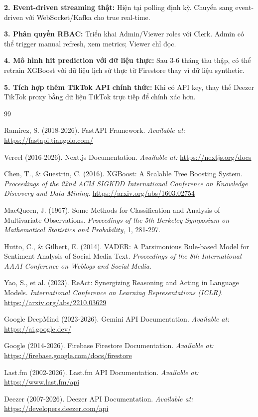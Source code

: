\documentclass[12pt,a4paper]{report}
\begin{document}
\noindent
\textbf{2. Event-driven streaming thật:} Hiện tại polling định kỳ. Chuyển sang event-driven với WebSocket/Kafka cho true real-time.

\noindent
\textbf{3. Phân quyền RBAC:} Triển khai Admin/Viewer roles với Clerk. Admin có thể trigger manual refresh, xem metrics; Viewer chỉ đọc.

\noindent
\textbf{4. Mô hình hit prediction với dữ liệu thực:} Sau 3-6 tháng thu thập, có thể retrain XGBoost với dữ liệu lịch sử thực từ Firestore thay vì dữ liệu synthetic.

\noindent
\textbf{5. Tích hợp thêm TikTok API chính thức:} Khi có API key, thay thế Deezer TikTok proxy bằng dữ liệu TikTok trực tiếp để chính xác hơn.

\begin{thebibliography}{99}

Ramírez, S. (2018-2026).
FastAPI Framework.
\textit{Available at:} \url{https://fastapi.tiangolo.com/}

Vercel (2016-2026).
Next.js Documentation.
\textit{Available at:} \url{https://nextjs.org/docs}

Chen, T., \& Guestrin, C. (2016).
XGBoost: A Scalable Tree Boosting System.
\textit{Proceedings of the 22nd ACM SIGKDD International Conference on Knowledge Discovery and Data Mining}.
\url{https://arxiv.org/abs/1603.02754}

MacQueen, J. (1967).
Some Methods for Classification and Analysis of Multivariate Observations.
\textit{Proceedings of the 5th Berkeley Symposium on Mathematical Statistics and Probability}, 1, 281-297.

Hutto, C., \& Gilbert, E. (2014).
VADER: A Parsimonious Rule-based Model for Sentiment Analysis of Social Media Text.
\textit{Proceedings of the 8th International AAAI Conference on Weblogs and Social Media}.

Yao, S., et al. (2023).
ReAct: Synergizing Reasoning and Acting in Language Models.
\textit{International Conference on Learning Representations (ICLR)}.
\url{https://arxiv.org/abs/2210.03629}

Google DeepMind (2023-2026).
Gemini API Documentation.
\textit{Available at:} \url{https://ai.google.dev/}

Google (2014-2026).
Firebase Firestore Documentation.
\textit{Available at:} \url{https://firebase.google.com/docs/firestore}

Last.fm (2002-2026).
Last.fm API Documentation.
\textit{Available at:} \url{https://www.last.fm/api}

Deezer (2007-2026).
Deezer API Documentation.
\textit{Available at:} \url{https://developers.deezer.com/api}

\end{thebibliography}
\end{document}
